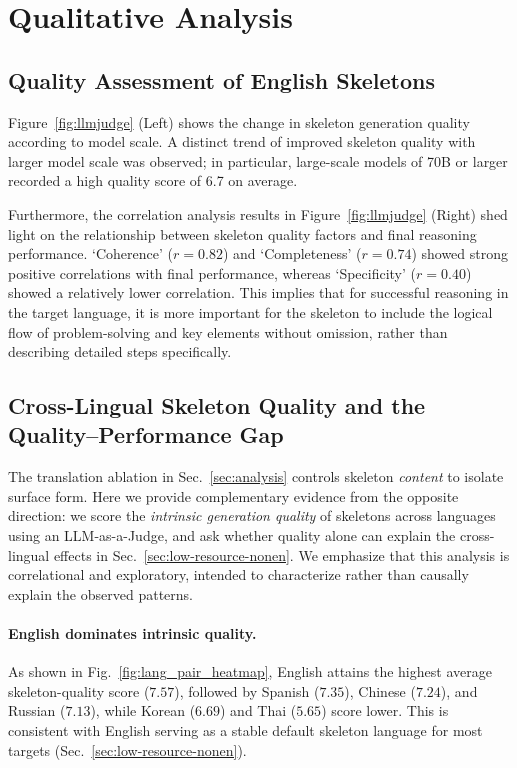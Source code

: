 \section{Qualitative Analysis}
\label{Appendix:skeleton_qualitative}
\subsection{Quality Assessment of English Skeletons}

Figure~\ref{fig:llmjudge} (Left) shows the change in skeleton generation quality according to model scale. A distinct trend of improved skeleton quality with larger model scale was observed; in particular, large-scale models of 70B or larger recorded a high quality score of 6.7 on average.

Furthermore, the correlation analysis results in Figure~\ref{fig:llmjudge} (Right) shed light on the relationship between skeleton quality factors and final reasoning performance. `Coherence' ($r=0.82$) and `Completeness' ($r=0.74$) showed strong positive correlations with final performance, whereas `Specificity' ($r=0.40$) showed a relatively lower correlation. This implies that for successful reasoning in the target language, it is more important for the skeleton to include the logical flow of problem-solving and key elements without omission, rather than describing detailed steps specifically.


\subsection{Cross-Lingual Skeleton Quality and the Quality--Performance Gap}

The translation ablation in Sec.~\ref{sec:analysis} controls skeleton \emph{content} to isolate surface form. Here we provide complementary evidence from the opposite direction: we score the \emph{intrinsic generation quality} of skeletons across languages using an LLM-as-a-Judge, and ask whether quality alone can explain the cross-lingual effects in Sec.~\ref{sec:low-resource-nonen}. We emphasize that this analysis is correlational and exploratory, intended to characterize rather than causally explain the observed patterns.

\paragraph{English dominates intrinsic quality.}
As shown in Fig.~\ref{fig:lang_pair_heatmap}, English attains the highest average skeleton-quality score ($7.57$), followed by Spanish ($7.35$), Chinese ($7.24$), and Russian ($7.13$), while Korean ($6.69$) and Thai ($5.65$) score lower. This is consistent with English serving as a stable default skeleton language for most targets (Sec.~\ref{sec:low-resource-nonen}).

